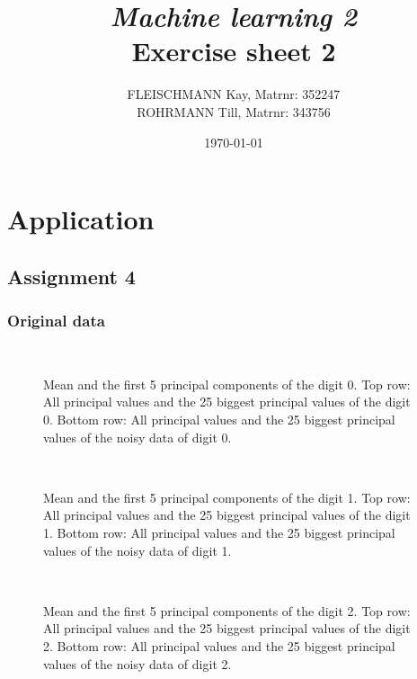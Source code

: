 \documentclass[a4paper, 12pt, titlepage]{article}
\title
{{\em Machine learning 2}\\
Exercise sheet 2}
\author{FLEISCHMANN Kay, Matrnr: 352247\\
	ROHRMANN Till, Matrnr: 343756}
\date{\today}
\begin{document}
\maketitle

\setcounter{section}{1}
\section{Application}

\subsection*{Assignment 4}

\subsubsection*{Original data}

\begin{figure}[H]
	\centering
	\\
	\caption{\protect{} Mean and the first 5 principal components of the digit 0. \protect{} Top row: All principal values and the 25 biggest principal values of the digit 0. Bottom row: All principal values and the 25 biggest principal values of the noisy data of digit 0.}
\end{figure}

\begin{figure}[H]
	\centering
	\\
	\caption{\protect{} Mean and the first 5 principal components of the digit 1. \protect{} Top row: All principal values and the 25 biggest principal values of the digit 1. Bottom row: All principal values and the 25 biggest principal values of the noisy data of digit 1.}
\end{figure}

\begin{figure}[H]
	\centering
	\\
	\caption{\protect{} Mean and the first 5 principal components of the digit 2. \protect{} Top row: All principal values and the 25 biggest principal values of the digit 2. Bottom row: All principal values and the 25 biggest principal values of the noisy data of digit 2.}
\end{figure}
\end{document}
